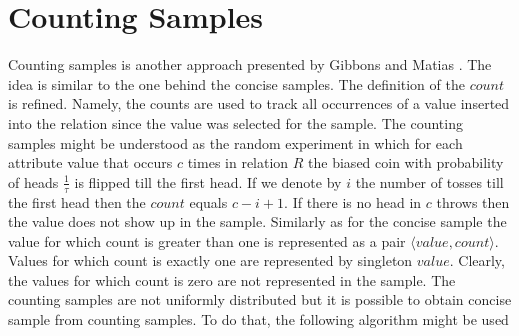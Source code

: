 \section{Counting Samples}
Counting samples is another approach presented by Gibbons and Matias
\cite{GM98}. The idea is similar to the one behind the concise
samples. The definition of the $count$ is refined. Namely, the counts
are used to track all occurrences of a value inserted into the
relation since the value was selected for the sample. The counting
samples might be understood as the random experiment in which for each
attribute value that occurs $c$ times in relation $R$ the biased coin
with probability of heads $\frac{1}{\tau}$ is flipped till the first
head. If we denote by $i$ the number of tosses till the first head
then the $count$ equals $c - i + 1$. If there is no head in $c$ throws
then the value does not show up in the sample. Similarly as for the
concise sample the value for which count is greater than one is
represented as a pair $\langle value, count \rangle$. Values for
which count is exactly one are represented by singleton
$value$. Clearly, the values for which count is zero are not
represented in the sample. The counting samples are not uniformly
distributed but it is possible to obtain concise sample from counting
samples. To do that, the following algorithm might be used